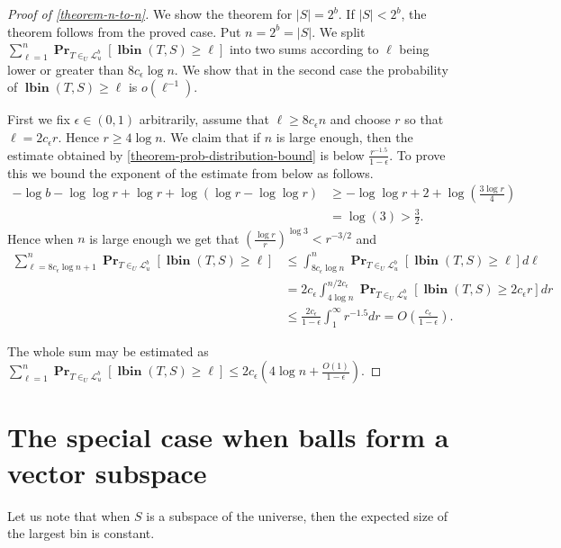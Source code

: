 \documentclass[unicode,review]{siamart1116}
\newcommand{\lbin}[2]{\operatorname{\mathbf{lbin}}({#1}, {#2})}
\newcommand{\linearmaps}[2]{\mathcal{L}_{#1}^{#2}}
\newcommand{\probs}[2]{\operatorname{\mathbf{Pr}}_{{#1}}\left[{#2}\right]}
\numberwithin{theorem}{section}
\begin{document}
\begin{proof}[Proof of \cref{theorem-n-to-n}]
We show the theorem for $|S| = 2^b$.
If $|S| < 2^b$, the theorem follows from the proved case.
Put $n = 2^b = |S|$.
We split $\sum_{\ell = 1}^{n} \probs{T\in_U\linearmaps{u}{b}}{\lbin{T}{S} \geq \ell}$ into two sums according to $\ell$ being lower or greater than $8c_\epsilon \log n$.
We show that in the second case the probability of $\lbin{T}{S} \geq \ell$ is $o(\ell^{-1})$.

First we fix $\epsilon \in (0, 1)$ arbitrarily, assume that $\ell \geq 8c_\epsilon n$ and choose $r$ so that $\ell = 2 c_\epsilon r$.
Hence $r \geq 4\log n$.
We claim that if $n$ is large enough, then the estimate obtained by \cref{theorem-prob-distribution-bound} is below $\frac{r^{-1.5}}{1-\epsilon}$.
To prove this we bound the exponent of the estimate from below as follows.
\begin{align*}
-\log b - \log \log r + \log r + \log (\log r - \log \log r) 
	& \geq -\log \log r + 2 + \log \left(\frac{3\log r}{4}\right) \\
	& = \log(3) > \frac{3}{2}.
\end{align*}
Hence when $n$ is large enough we get that $\left(\frac{\log r}{r}\right)^{\log 3} < r^{-3/2}$ and
\begin{align*}
\sum_{\ell = 8c_\epsilon \log n + 1}^{n} \probs{T\in_U\linearmaps{u}{b}}{\lbin{T}{S} \geq \ell} 
	& \leq \int_{8c_\epsilon \log n}^{n} \probs{T\in_U\linearmaps{u}{b}}{\lbin{T}{S} \geq \ell} d\ell \\
	& = 2c_\epsilon \int_{4 \log n}^{n/2c_\epsilon} \probs{T\in_U\linearmaps{u}{b}}{\lbin{T}{S} \geq 2c_\epsilon r} dr \\
	& \leq \frac{2c_\epsilon}{1-\epsilon} \int_{1}^{\infty} r^{-1.5} dr = O\left(\frac{c_\epsilon}{1-\epsilon}\right).
\end{align*}

The whole sum may be estimated as $
\sum_{\ell = 1}^{n} \probs{T\in_U\linearmaps{u}{b}}{\lbin{T}{S} \geq \ell} \leq 2c_\epsilon \left(4 \log n + \frac{O(1)}{1-\epsilon}\right).$
\end{proof}

\section{The special case when balls form a vector subspace}

Let us note that when $S$ is a subspace of the universe, then the expected size of the largest bin is constant.
\end{document}
